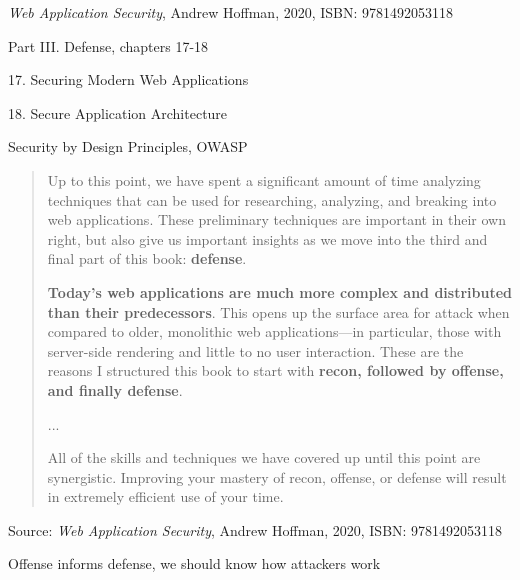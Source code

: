 \documentclass[Screen16to9,17pt]{foils}
\begin{document}

\emph{Web Application Security}, Andrew Hoffman, 2020, ISBN: 9781492053118

\begin{list1}
\item Part III. Defense, chapters 17-18
\item 17. Securing Modern Web Applications
\item 18. Secure Application Architecture

\item Security by Design Principles, OWASP\\
\end{list1}



\begin{quote}\small
Up to this point, we have spent a significant amount of time analyzing techniques that can be used for researching, analyzing, and breaking into web applications. These preliminary techniques are important in their own right, but also give us important insights as we move into the third and final part of this book: {\bf defense}.

{\bf Today’s web applications are much more complex and distributed than their predecessors}. This opens up the surface area for attack when compared to older, monolithic web applications—in particular, those with server-side rendering and little to no user interaction. These are the reasons I structured this book to start with {\bf recon, followed by offense, and finally defense}.

...

All of the skills and techniques we have covered up until this point are synergistic.
Improving your mastery of recon, offense, or defense will result in extremely efficient
use of your time.
\end{quote}
Source: \emph{Web Application Security}, Andrew Hoffman, 2020, ISBN: 9781492053118

\begin{list2}
\item Offense informs defense, we should know how attackers work
\end{list2}



\end{document}
